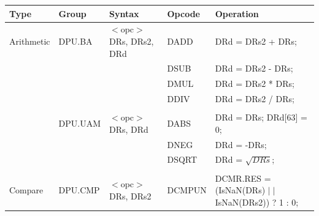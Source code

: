 \begin{table}
\begin{subtable}{\linewidth}
\begin{center}
\scriptsize
\begin{tabular}{lllll}
\hline
Type               & Group             & Syntax                                & Opcode            & Operation                                                                     \\ \hline
Arithmetic         & DPU.BA            & $<$opc$>$ DRs, DRs2, DRd              & DADD              & DRd = DRs2 + DRs;                                                             \\
                   &                   &                                       & DSUB              & DRd = DRs2 - DRs;                                                             \\
                   &                   &                                       & DMUL              & DRd = DRs2 * DRs;                                                             \\
                   &                   &                                       & DDIV              & DRd = DRs2 / DRs;                                                             \\
                   &                   &                                       &                   &                                                                               \\
                   & DPU.UAM           & $<$opc$>$ DRs, DRd                    & DABS              & DRd = DRs; DRd[63] = 0;                                                       \\
                   &                   &                                       & DNEG              & DRd = -DRs;                                                                   \\
                   &                   &                                       & DSQRT             & DRd = $\sqrt{DRs}$;                                                           \\
                   &                   &                                       &                   &                                                                               \\
Compare            & DPU.CMP           & $<$opc$>$ DRs, DRs2                   & DCMPUN            & DCMR.RES = (IsNaN(DRs) $\mid\mid$ IsNaN(DRs2)) ? 1 : 0;                       \\

\end{tabular}
\end{center}
\end{subtable}
\end{table}
